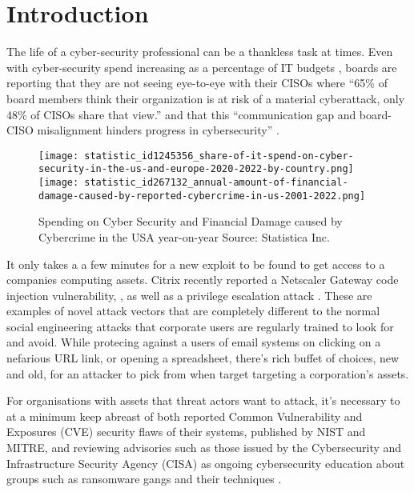 \section{Introduction}


The life of a cyber-security professional can be a thankless task at times. Even with cyber-security spend increasing as a percentage of IT budgets \autocite{Hiscox:2022},
boards are reporting that they are not seeing eye-to-eye with their CISOs where \enquote{65\% of board members think their organization is at risk of a material
  cyberattack, only 48\% of CISOs share that view.} and that this \enquote{communication gap and board-CISO misalignment hinders progress in cybersecurity}
\autocite{Milica:2023}.

\begin{figure}[H] %
  \texttt{[image: statistic\_id1245356\_share-of-it-spend-on-cyber-security-in-the-us-and-europe-2020-2022-by-country.png]}\hfill
  \texttt{[image: statistic\_id267132\_annual-amount-of-financial-damage-caused-by-reported-cybercrime-in-us-2001-2022.png]}\hfill
  \caption{Spending on Cyber Security  \autocite{Hiscox:2022} and Financial Damage caused by Cybercrime in the USA year-on-year \autocite{FBI:2023} Source: Statistica Inc.}
  \label{fig:cyber-spend-vs-cost}
\end{figure}


It only takes a a few minutes for a new exploit to be found to get access to a companies computing assets.  Citrix recently reported a Netscaler Gateway code injection
vulnerability, \autocite{CVE-2023-3519}, as well as a privilege escalation attack \autocite{CVE-2023-3467}.  These are examples of novel attack vectors that  are
completely different to the normal social engineering attacks that corporate users are regularly trained to look for and avoid.  While protecing against a users of
email systems on clicking on a nefarious URL link, or opening a spreadsheet, there's rich buffet of choices, new and old, for an attacker to pick from when target
targeting a corporation's assets.

For organisations with assets that threat actors want to attack, it's necessary to at a minimum keep abreast of both reported Common Vulnerability and Exposures (CVE)
security flaws of their systems, published by NIST and MITRE, and reviewing advisories such as those issued by the Cybersecurity and Infrastructure Security Agency (CISA)
as ongoing cybersecurity education about groups such as ransomware gangs and their techniques \autocite{CISA:2023}.

